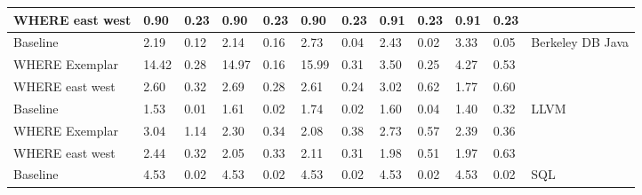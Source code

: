 \documentclass{sig-alternative}
\begin{document}
\begin{table}
\begin{tabular}{|l|l|l|l|l|l|l|l|l|l|ll|}
\multicolumn{1}{|l|}{WHERE east west} & 0.90                & 0.23             & 0.90                & 0.23             & 0.90                & 0.23             & 0.91                & 0.23             & 0.91                & \multicolumn{1}{l|}{0.23}  &                                           \\ \hline
\multicolumn{1}{|l|}{Baseline}        & 2.19                & 0.12             & 2.14                & 0.16             & 2.73                & 0.04             & 2.43                & 0.02             & 3.33                & \multicolumn{1}{l|}{0.05}  & \multirow{3}{*}{Berkeley DB Java}         \\
\multicolumn{1}{|l|}{WHERE Exemplar}  & 14.42               & 0.28             & 14.97               & 0.16             & 15.99               & 0.31             & 3.50                & 0.25             & 4.27                & \multicolumn{1}{l|}{0.53}  &                                           \\
\multicolumn{1}{|l|}{WHERE east west} & 2.60                & 0.32             & 2.69                & 0.28             & 2.61                & 0.24             & 3.02                & 0.62             & 1.77               & \multicolumn{1}{l|}{0.60}  &                                           \\ \hline
\multicolumn{1}{|l|}{Baseline}        & 1.53                & 0.01             & 1.61                & 0.02             & 1.74                & 0.02             & 1.60                & 0.04             & 1.40                 & \multicolumn{1}{l|}{0.32}  & \multirow{3}{*}{LLVM}                     \\
\multicolumn{1}{|l|}{WHERE Exemplar}  & 3.04                & 1.14             & 2.30                & 0.34             & 2.08                & 0.38             & 2.73               & 0.57             & 2.39                & \multicolumn{1}{l|}{0.36}  &                                           \\
\multicolumn{1}{|l|}{WHERE east west} & 2.44                & 0.32             & 2.05                & 0.33             & 2.11                & 0.31             & 1.98                 & 0.51             & 1.97                & \multicolumn{1}{l|}{0.63}  &                                           \\ \hline
\multicolumn{1}{|l|}{Baseline}        & 4.53                & 0.02             & 4.53                & 0.02           & 4.53                & 0.02             & 4.53                & 0.02            & 4.53                & \multicolumn{1}{l|}{0.02}  & \multirow{3}{*}{SQL}                         \\

\end{tabular}
\end{table}
\end{document}

